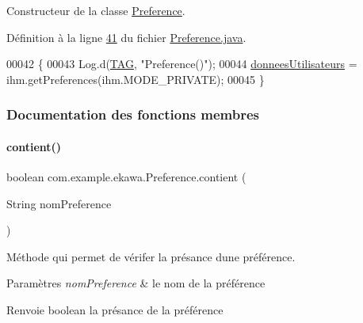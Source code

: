 Constructeur de la classe \hyperlink{classcom_1_1example_1_1ekawa_1_1_preference}{Preference}. 



Définition à la ligne \hyperlink{_preference_8java_source_l00041}{41} du fichier \hyperlink{_preference_8java_source}{Preference.\+java}.


\begin{DoxyCode}
00042     \{
00043         Log.d(\hyperlink{classcom_1_1example_1_1ekawa_1_1_preference_aeb5e1e787153c37929839622ac5d0339}{TAG}, \textcolor{stringliteral}{"Preference()"});
00044         \hyperlink{classcom_1_1example_1_1ekawa_1_1_preference_a5ac49439bd1c8c3ff12dd9eb2475b894}{donneesUtilisateurs} = ihm.getPreferences(ihm.MODE\_PRIVATE);
00045     \}
\end{DoxyCode}


\subsubsection{Documentation des fonctions membres}
\mbox{\label{classcom_1_1example_1_1ekawa_1_1_preference_a25b7a4cfcc9fe5f9258471ce454a718a}} 
\paragraph{\texorpdfstring{contient()}{contient()}}
{\footnotesize\ttfamily boolean com.\+example.\+ekawa.\+Preference.\+contient (\begin{DoxyParamCaption}\item[{String}]{nom\+Preference }\end{DoxyParamCaption})}



Méthode qui permet de vérifer la présance d\textquotesingle{}une préférence. 


\begin{DoxyParams}{Paramètres}
{\em nom\+Preference} & le nom de la préférence \\
\hline
\end{DoxyParams}
\begin{DoxyReturn}{Renvoie}
boolean la présance de la préférence 
\end{DoxyReturn}


